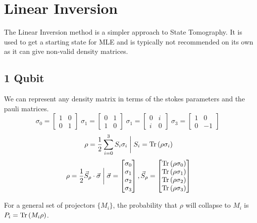 \documentclass{article}
\begin{document}
\section{Linear Inversion}
The Linear Inversion method is a simpler approach to State Tomography. It is used to get a starting state for MLE and is typically not recommended on its own as it can give non-valid density matrices.
\subsection{1 Qubit}
We can represent any density matrix in terms of the stokes parameters and the pauli matrices.
$$
\sigma_0 = \begin{bmatrix}1 & 0\\0 & 1 \end{bmatrix} \;
\sigma_1 = \begin{bmatrix}0 & 1\\1 & 0 \end{bmatrix} \;
\sigma_1 = \begin{bmatrix}0 & i\\i & 0 \end{bmatrix} \;
\sigma_3 = \begin{bmatrix}1 & 0\\0 &-1 \end{bmatrix} \;$$
$$\rho = \frac{1}{2}\sum_{i=0}^3 S_i \sigma_i \;\bigg|\; S_i = \operatorname{Tr}\left(\rho\sigma_i\right) $$
$$\rho = \frac{1}{2}\vec{S}_\rho \cdot \vec{\sigma} 
\;\bigg|\; 
\vec{\sigma} = \begin{bmatrix}\sigma_0 \\ \sigma_1 \\ \sigma_2 \\ \sigma_3\end{bmatrix},
\vec{S}_\rho = \begin{bmatrix}\operatorname{Tr}\left(\rho\sigma_0\right) \\ \operatorname{Tr}\left(\rho\sigma_1\right) \\ \operatorname{Tr}\left(\rho\sigma_2\right) \\ \operatorname{Tr}\left(\rho\sigma_3\right)\end{bmatrix}$$

For a general set of projectors $\{M_i\}$, the probability that $\rho$ will collapse to $M_i$ is $P_i = \operatorname{Tr}\left(M_i\rho\right)$.
\end{document}
